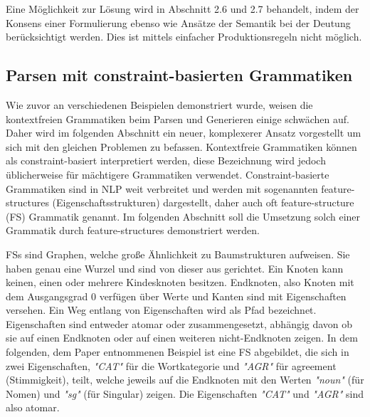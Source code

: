 \documentclass[12pt]{paper}
\begin{document}
Eine Möglichkeit zur Lösung wird in Abschnitt 2.6 und 2.7 behandelt, indem der Konsens einer Formulierung ebenso wie Ansätze der Semantik bei der Deutung berücksichtigt werden. Dies ist mittels einfacher Produktionsregeln nicht möglich.

\subsection{Parsen mit constraint-basierten Grammatiken}
Wie zuvor an verschiedenen Beispielen demonstriert wurde, weisen die kontextfreien Grammatiken beim Parsen und Generieren einige schwächen auf. Daher wird im folgenden Abschnitt ein neuer, komplexerer Ansatz vorgestellt um sich mit den gleichen Problemen zu befassen. Kontextfreie Grammatiken können als constraint-basiert interpretiert werden, diese Bezeichnung wird jedoch üblicherweise für mächtigere Grammatiken verwendet. Constraint-basierte Grammatiken sind in NLP weit verbreitet und werden mit sogenannten feature-structures (Eigenschaftsstrukturen) dargestellt, daher auch oft feature-structure (FS) Grammatik genannt. Im folgenden Abschnitt soll die Umsetzung solch einer Grammatik durch feature-structures demonstriert werden.


FSs sind Graphen, welche große Ähnlichkeit zu Baumstrukturen aufweisen. Sie haben genau eine Wurzel und sind von dieser aus gerichtet. Ein Knoten kann keinen, einen oder mehrere Kindesknoten besitzen. Endknoten, also Knoten mit dem Ausgangsgrad 0 verfügen über Werte und Kanten sind mit Eigenschaften versehen. Ein Weg entlang von Eigenschaften wird als Pfad bezeichnet. Eigenschaften sind entweder atomar oder zusammengesetzt, abhängig davon ob sie auf einen Endknoten oder auf einen weiteren nicht-Endknoten zeigen. In dem folgenden, dem Paper entnommenen Beispiel ist eine FS abgebildet, die sich in zwei Eigenschaften, \textit{"CAT"} für die Wortkategorie und \textit{"AGR"} für agreement (Stimmigkeit), teilt, welche jeweils auf die Endknoten mit den Werten \textit{"noun"} (für Nomen) und \textit{"sg"} (für Singular) zeigen. Die Eigenschaften \textit{"CAT"} und \textit{"AGR"} sind also atomar.

\begin{center}
\end{center}
\end{document}
